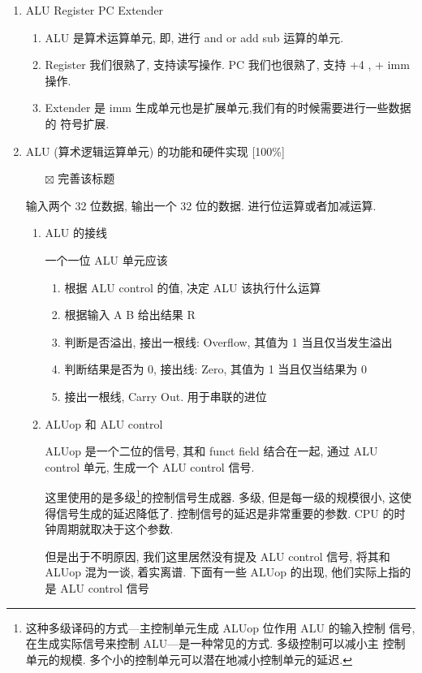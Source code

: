 \documentclass[11pt]{ctexart}
\begin{document}
\begin{enumerate}
\item ALU Register PC Extender
\label{sec:org86ffe21}

\begin{enumerate}
\item ALU 是算术运算单元, 即, 进行 and or add sub 运算的单元.
\item Register 我们很熟了, 支持读写操作. PC 我们也很熟了, 支持 +4 , + imm
操作.
\item Extender 是 imm 生成单元也是扩展单元,我们有的时候需要进行一些数据的
符号扩展.
\end{enumerate}
\item ALU (算术逻辑运算单元) 的功能和硬件实现 [100\%]
\label{sec:orgd090755}

\begin{itemize}
\item[{$\boxtimes$}] 完善该标题
\end{itemize}
输入两个 32 位数据, 输出一个 32 位的数据. 进行位运算或者加减运算. 

\begin{enumerate}
\item ALU 的接线
\label{sec:orga0220ea}

一个一位 ALU 单元应该
\begin{enumerate}
\item 根据 ALU control 的值, 决定 ALU 该执行什么运算
\item 根据输入 A B 给出结果 R
\item 判断是否溢出, 接出一根线: Overflow, 其值为 1 当且仅当发生溢出
\item 判断结果是否为 0, 接出线: Zero, 其值为 1 当且仅当结果为 0
\item 接出一根线, Carry Out. 用于串联的进位
\end{enumerate}
\item ALUop 和 ALU control
\label{sec:org40573f9}

ALUop 是一个二位的信号, 其和 funct field 结合在一起, 通过 ALU 
control 单元, 生成一个 ALU control 信号. 

这里使用的是多级\footnote{这种多级译码的方式---主控制单元生成 ALUop 位作用 ALU 的输入控制
信号, 在生成实际信号来控制 ALU---是一种常见的方式. 多级控制可以减小主
控制单元的规模. 多个小的控制单元可以潜在地减小控制单元的延迟.}的控制信号生成器. 多级, 但是每一级的规模很小, 这使得信号生成的延迟降低了. 控制信号的延迟是非常重要的参数. CPU 的时钟周期就取决于这个参数. 

但是出于不明原因, 我们这里居然没有提及 ALU control 信号, 将其和 ALUop
混为一谈, 着实离谱. 下面有一些 ALUop 的出现, 他们实际上指的是 ALU
control 信号


\end{enumerate}
\end{enumerate}
\end{document}
